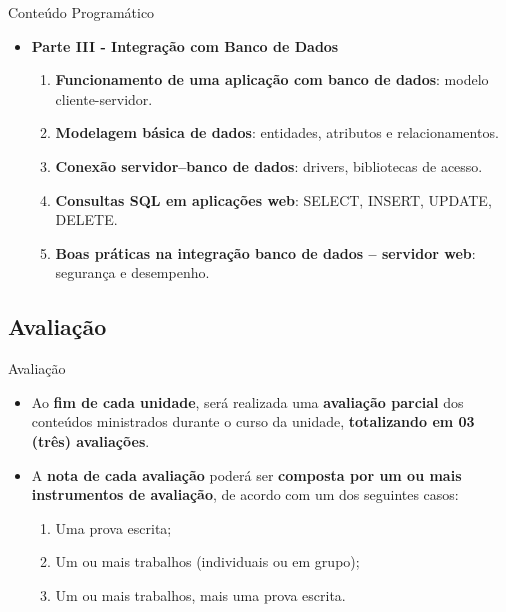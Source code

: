\documentclass{beamer}
\begin{document}
\begin{frame}{Conteúdo Programático}
    \begin{itemize}
        \justifying
        \item \textbf{Parte III - Integração com Banco de Dados}
            \begin{enumerate}
                \justifying
                \item \textbf{Funcionamento de uma aplicação com banco de dados}: modelo cliente-servidor.
                \item \textbf{Modelagem básica de dados}: entidades, atributos e relacionamentos.
                \item \textbf{Conexão servidor–banco de dados}: drivers, bibliotecas de acesso.
                \item \textbf{Consultas SQL em aplicações web}: SELECT, INSERT, UPDATE, DELETE.
                \item \textbf{Boas práticas na integração banco de dados – servidor web}: segurança e desempenho.
            \end{enumerate}
    \end{itemize}
\end{frame}

\subsection{Avaliação}

\begin{frame}{Avaliação}
    \begin{itemize}
        \justifying
        \item Ao \textbf{fim de cada unidade}, será realizada uma \textbf{avaliação parcial} dos conteúdos ministrados durante o curso da unidade, \alert{\textbf{totalizando em 03 (três) avaliações}}.
        \item A \textbf{nota de cada avaliação} poderá ser \textbf{composta por um ou mais instrumentos de avaliação}, de acordo com um dos seguintes casos:
        \begin{enumerate}
            \justifying
            \item Uma prova escrita;
            \item Um ou mais trabalhos (individuais ou em grupo);
            \item Um ou mais trabalhos, mais uma prova escrita.
        \end{enumerate}
    \end{itemize}
\end{frame}
\end{document}
